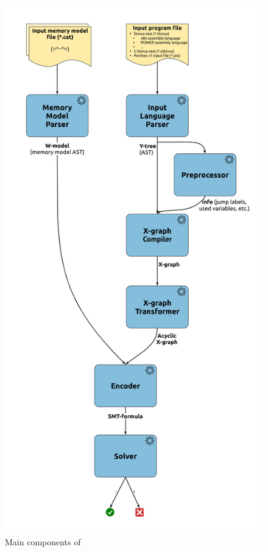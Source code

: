 \begin{figure}%
  \centering
  \includegraphics[width=\textwidth,height=\textheight,keepaspectratio]{img/my/lucidchart.com/data-flow-vert-300dpi.png}
  \caption{Main components of \porthos[2]}
  \label{fig:program-components}
\end{figure}


